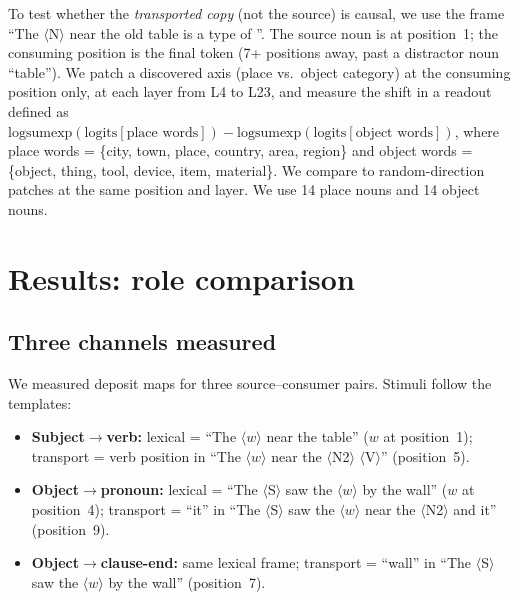 \documentclass[11pt,a4paper]{article}
\begin{document}
To test whether the \emph{transported copy} (not the source) is causal, we use the frame
``The $\langle$N$\rangle$ near the old table is a type of \underline{\hspace{1cm}}''. The
source noun is at position~1; the consuming position is the final token (7+ positions away,
past a distractor noun ``table''). We patch a discovered axis (place vs.\ object category) at
the consuming position only, at each layer from L4 to L23, and measure the shift in a
readout defined as $\mathrm{logsumexp}(\text{logits}[\text{place words}]) -
\mathrm{logsumexp}(\text{logits}[\text{object words}])$, where place words = \{city, town,
place, country, area, region\} and object words = \{object, thing, tool, device, item,
material\}. We compare to random-direction patches at the same position and layer. We use 14
place nouns and 14 object nouns.

\section{Results: role comparison}
\label{sec:role-comparison}

\subsection{Three channels measured}

We measured deposit maps for three source--consumer pairs. Stimuli follow the templates:

\begin{itemize}
\item \textbf{Subject$\to$verb:} lexical = ``The $\langle w \rangle$ near the table''
($w$ at position~1); transport = verb position in ``The $\langle w \rangle$ near the
$\langle$N2$\rangle$ $\langle$V$\rangle$'' (position~5).
\item \textbf{Object$\to$pronoun:} lexical = ``The $\langle$S$\rangle$ saw the $\langle w
\rangle$ by the wall'' ($w$ at position~4); transport = ``it'' in ``The $\langle$S$\rangle$
saw the $\langle w \rangle$ near the $\langle$N2$\rangle$ and it'' (position~9).
\item \textbf{Object$\to$clause-end:} same lexical frame; transport = ``wall'' in ``The
$\langle$S$\rangle$ saw the $\langle w \rangle$ by the wall'' (position~7).
\end{itemize}
\end{document}
